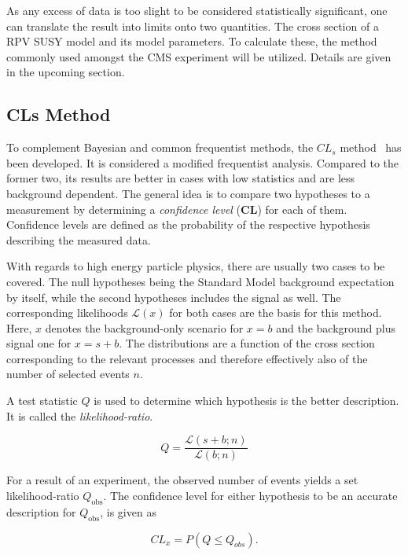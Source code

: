 As any excess of data is too slight to be considered statistically significant, one can translate the result into limits onto two quantities. The cross section of a RPV SUSY model and its model parameters. To calculate these, the method commonly used amongst the CMS experiment will be utilized. Details are given in the upcoming section.


\subsection{CLs Method}
\label{sec:cls-method}

To complement Bayesian and common frequentist methods, the $CL_s$ method~\cite{cls,cls2} has been developed. It is considered a modified frequentist analysis. Compared to the former two, its results are better in cases with low statistics and are less background dependent. The general idea is to compare two hypotheses to a measurement by determining a \textit{confidence level} (\textbf{CL}) for each of them. Confidence levels are defined as the probability of the respective hypothesis describing the measured data.

With regards to high energy particle physics, there are usually two cases to be covered. The null hypotheses being the Standard Model background expectation by itself, while the second hypotheses includes the signal as well. The corresponding likelihoods $\mathcal{L} (x)$ for both cases are the basis for this method. Here, $x$ denotes the background-only scenario for $x = b$ and the background plus signal one for $x = s + b$. The distributions are a function of the cross section corresponding to the relevant processes and therefore effectively also of the number of selected events $n$.

A test statistic $Q$ is used to determine which hypothesis is the better description. It is called the \textit{likelihood-ratio}.

\begin{equation}
  \label{eq:testq}
  Q = \frac{\mathcal{L} (s + b; n)}{\mathcal{L} (b; n)}
\end{equation}

For a result of an experiment, the observed number of events yields a set likelihood-ratio $Q_{\text{obs}}$. The confidence level for either hypothesis to be an accurate description for $Q_{\text{obs}}$, is given as

\begin{equation}
  \label{eq:cl-prob}
  CL_x = P (Q \leq Q_{obs}).
\end{equation}

